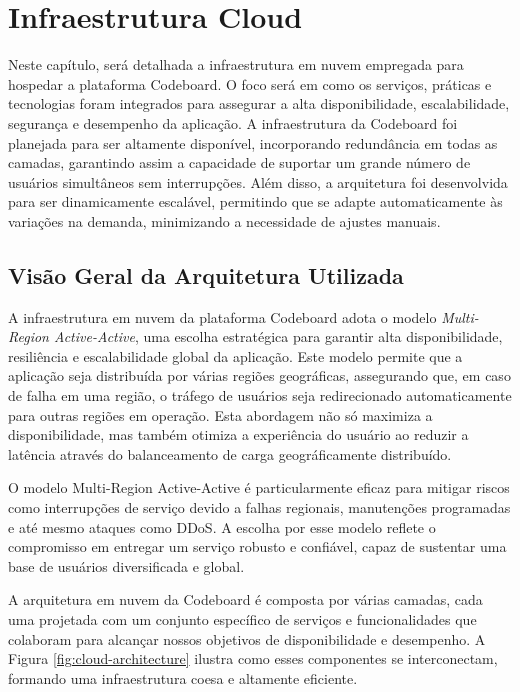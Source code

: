 \section{Infraestrutura Cloud}

Neste capítulo, será detalhada a infraestrutura em nuvem empregada para hospedar a plataforma Codeboard. O foco será em como os serviços, práticas e tecnologias foram integrados para assegurar a alta disponibilidade, escalabilidade, segurança e desempenho da aplicação. A infraestrutura da Codeboard foi planejada para ser altamente disponível, incorporando redundância em todas as camadas, garantindo assim a capacidade de suportar um grande número de usuários simultâneos sem interrupções. Além disso, a arquitetura foi desenvolvida para ser dinamicamente escalável, permitindo que se adapte automaticamente às variações na demanda, minimizando a necessidade de ajustes manuais.

\subsection{Visão Geral da Arquitetura Utilizada}

A infraestrutura em nuvem da plataforma Codeboard adota o modelo \emph{Multi-Region Active-Active}, uma escolha estratégica para garantir alta disponibilidade, resiliência e escalabilidade global da aplicação. Este modelo permite que a aplicação seja distribuída por várias regiões geográficas, assegurando que, em caso de falha em uma região, o tráfego de usuários seja redirecionado automaticamente para outras regiões em operação. Esta abordagem não só maximiza a disponibilidade, mas também otimiza a experiência do usuário ao reduzir a latência através do balanceamento de carga geográficamente distribuído.

O modelo Multi-Region Active-Active é particularmente eficaz para mitigar riscos como interrupções de serviço devido a falhas regionais, manutenções programadas e até mesmo ataques como DDoS. A escolha por esse modelo reflete o compromisso em entregar um serviço robusto e confiável, capaz de sustentar uma base de usuários diversificada e global.

A arquitetura em nuvem da Codeboard é composta por várias camadas, cada uma projetada com um conjunto específico de serviços e funcionalidades que colaboram para alcançar nossos objetivos de disponibilidade e desempenho. A Figura \ref{fig:cloud-architecture} ilustra como esses componentes se interconectam, formando uma infraestrutura coesa e altamente eficiente.

